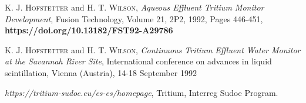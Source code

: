 \begin{thebibliography}{100}
 \textsc{K. J. Hofstetter} and \textsc{H. T. Wilson},
\textit{Aqueous Effluent Tritium Monitor Development}, Fusion Technology, Volume 21, 2P2, 1992, Pages 446-451, \textbf{https://doi.org/10.13182/FST92-A29786}

 \textsc{K. J. Hofstetter} and \textsc{H. T. Wilson},
\textit{Continuous Tritium Effluent Water Monitor at the Savannah River Site}, International conference on advances in liquid scintillation, Vienna (Austria), 14-18 September 1992

 \textit{https://tritium-sudoe.eu/es-es/homepage}, Tritium, Interreg Sudoe Program.
\end{thebibliography}